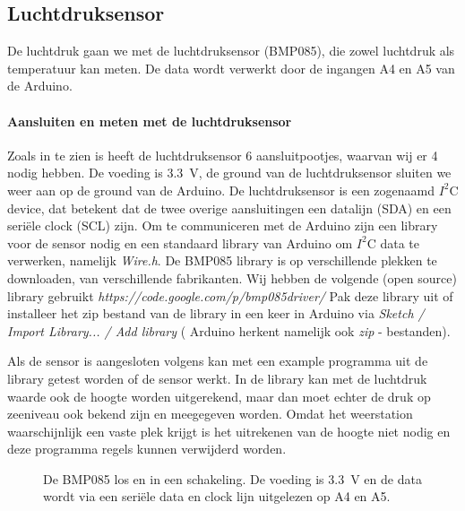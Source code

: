 \subsection{Luchtdruksensor}

De luchtdruk gaan we met de luchtdruksensor (BMP085), die zowel luchtdruk als 
temperatuur kan meten. De data wordt verwerkt door de ingangen A4 en A5 van 
de Arduino.

\paragraph{Aansluiten en meten met de luchtdruksensor}

Zoals in  te zien is heeft de luchtdruksensor 6
aansluitpootjes, waarvan wij er 4 nodig hebben. De voeding is
\SI{3.3}{\volt}, de ground van de luchtdruksensor sluiten we weer aan op
de ground van de Arduino. De luchtdruksensor is een zogenaamd $I^{2}$C
device, dat betekent dat de twee overige aansluitingen een datalijn
(SDA) en een seriële clock (SCL) zijn. Om te communiceren met de
Arduino zijn een library voor de sensor nodig en een standaard library
van Arduino om $I^{2}$C data te verwerken, namelijk \emph{Wire.h}. De BMP085
library is op verschillende plekken te downloaden, van verschillende
fabrikanten. Wij hebben de volgende (open source) library gebruikt
\emph{https://code.google.com/p/bmp085driver/} Pak deze library uit of
installeer het zip bestand van de library in een keer in Arduino via \emph{Sketch /
Import Library... / Add library} ( Arduino herkent namelijk ook \emph{zip} - bestanden).

Als de sensor is aangesloten volgens 
kan met een example programma uit de library getest worden of de sensor
werkt. In de library kan met de luchtdruk waarde ook de hoogte worden
uitgerekend, maar dan moet echter de druk op zeeniveau ook bekend zijn
en meegegeven worden. Omdat het weerstation waarschijnlijk een vaste plek
krijgt is het uitrekenen van de hoogte niet nodig en deze programma
regels kunnen verwijderd worden.

\begin{figure}
    \centering
    \hfill
    \caption{De BMP085 los en in een schakeling. De voeding is \SI{3.3}{\volt} 
    en de data wordt via een seri\"{e}le data en clock lijn uitgelezen op A4 en A5.}
\end{figure}



